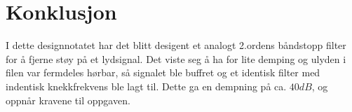 
\section{Konklusjon}
\label{konklusjon}

I dette designnotatet har det blitt desigent et analogt 2.ordens båndstopp filter for å fjerne støy på et lydsignal. Det viste seg å ha for lite demping og ulyden i filen var fermdeles hørbar, så signalet ble buffret og et identisk filter med indentisk knekkfrekvens ble lagt til. Dette ga en dempning på ca. $40dB$, og oppnår kravene til oppgaven.  
